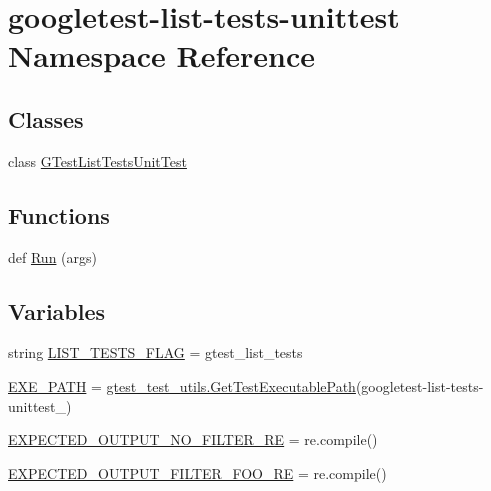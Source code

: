 \hypertarget{namespacegoogletest-list-tests-unittest}{}\section{googletest-\/list-\/tests-\/unittest Namespace Reference}
\label{namespacegoogletest-list-tests-unittest}
\subsection*{Classes}
\begin{DoxyCompactItemize}
\item 
class \mbox{\hyperlink{classgoogletest-list-tests-unittest_1_1_g_test_list_tests_unit_test}{G\+Test\+List\+Tests\+Unit\+Test}}
\end{DoxyCompactItemize}
\subsection*{Functions}
\begin{DoxyCompactItemize}
\item 
def \mbox{\hyperlink{namespacegoogletest-list-tests-unittest_a9e03b1bb25b16376b25e53a1927be5da}{Run}} (args)
\end{DoxyCompactItemize}
\subsection*{Variables}
\begin{DoxyCompactItemize}
\item 
string \mbox{\hyperlink{namespacegoogletest-list-tests-unittest_a0ed7b4792af42a3e286c09f42094659c}{L\+I\+S\+T\+\_\+\+T\+E\+S\+T\+S\+\_\+\+F\+L\+AG}} = \textquotesingle{}gtest\+\_\+list\+\_\+tests\textquotesingle{}
\item 
\mbox{\hyperlink{namespacegoogletest-list-tests-unittest_add30c7a45a9cc216146c8b152e2c3455}{E\+X\+E\+\_\+\+P\+A\+TH}} = \mbox{\hyperlink{namespacegtest__test__utils_a89ed3717984a80ffbb7a9c92f71b86a2}{gtest\+\_\+test\+\_\+utils.\+Get\+Test\+Executable\+Path}}(\textquotesingle{}googletest-\/list-\/tests-\/unittest\+\_\+\textquotesingle{})
\item 
\mbox{\hyperlink{namespacegoogletest-list-tests-unittest_abb2df597e07f0ba056b4a1d6109fd99f}{E\+X\+P\+E\+C\+T\+E\+D\+\_\+\+O\+U\+T\+P\+U\+T\+\_\+\+N\+O\+\_\+\+F\+I\+L\+T\+E\+R\+\_\+\+RE}} = re.\+compile()
\item 
\mbox{\hyperlink{namespacegoogletest-list-tests-unittest_aede0392cd15434ad8392838a94c29c5e}{E\+X\+P\+E\+C\+T\+E\+D\+\_\+\+O\+U\+T\+P\+U\+T\+\_\+\+F\+I\+L\+T\+E\+R\+\_\+\+F\+O\+O\+\_\+\+RE}} = re.\+compile()
\end{DoxyCompactItemize}


